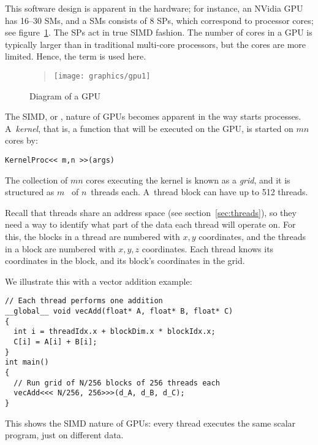 This software design is apparent in the hardware; for instance, an
NVidia \ac{GPU} has 16--30 \acfp{SM}, and a \acp{SM} consists of 8
\acfp{SP}, which correspond to processor cores; see
figure~\ref{fig:gpu-diagram}. The \acp{SP} act in true SIMD fashion.
The number of cores in a \ac{GPU} is
typically larger than in traditional multi-core processors, but the
cores are more limited. Hence, the term  is used here.

\begin{figure}[ht]
  \begin{quote}
    \texttt{[image: graphics/gpu1]}
  \end{quote}
  \caption{Diagram of a GPU}
  \label{fig:gpu-diagram}
\end{figure}

The \ac{SIMD}, or , nature of \acp{GPU} becomes
apparent in the way  starts
processes. A~\emph{kernel}, that is, a function that will
be executed on the \ac{GPU}, is started on $mn$ cores by:
\begin{verbatim}
KernelProc<< m,n >>(args)
\end{verbatim}
The collection of $mn$ cores executing the kernel is known as a
\emph{grid}, and it is structured as
$m$~ of $n$~threads each. 
A~thread block can have up to 512 threads.

Recall that threads share an address space (see
section~\ref{sec:threads}), so they need a way to identify what part
of the data each thread will operate on. For this, the blocks in a
thread are numbered with $x,y$ coordinates, and the threads in a block
are numbered with $x,y,z$ coordinates. Each thread knows its
coordinates in the block, and its block's coordinates in the grid.

We illustrate this with a vector addition example:
\begin{verbatim}
// Each thread performs one addition
__global__ void vecAdd(float* A, float* B, float* C)
{
  int i = threadIdx.x + blockDim.x * blockIdx.x;
  C[i] = A[i] + B[i];
}
int main()
{
  // Run grid of N/256 blocks of 256 threads each
  vecAdd<<< N/256, 256>>>(d_A, d_B, d_C);
}
\end{verbatim}
This shows the \ac{SIMD} nature of \acp{GPU}: every thread executes
the same scalar program, just on different data.

\begin{comment}
\begin{quote}
\begin{tabular}{|c|cccc|}
  \hline
     & SM & SP & thread blocks    & threads\\ \hline
  GPU& 16 &    & $8\times 16=128$ & \\
  SM &    &  8 & 8                & 768 \\
  \hline
\end{tabular}
\end{quote}
\end{comment}


